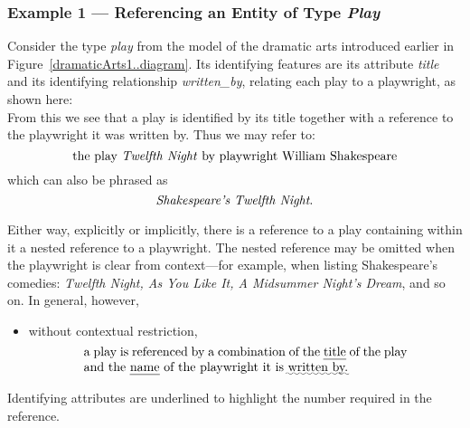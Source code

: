 \subsubsection{Example 1 — Referencing an Entity of Type \textit{Play}}

Consider the type \textit{play} from the model of the dramatic arts introduced earlier in Figure~\ref{dramaticArts1..diagram}.
Its identifying features are its attribute \textit{title} and its identifying relationship \textit{written\_by}, relating each play to a playwright, as shown here:
\begin{equation*}

\end{equation*}
From this we see that a play is identified by its title together with a reference to the playwright it was written by.
Thus we may refer to:
\begin{equation}
\mbox{the play \textit{Twelfth Night} by playwright William Shakespeare}
\end{equation}
which can also be phrased as
\begin{equation}
\mbox{\textit{Shakespeare’s Twelfth Night}.}
\end{equation}

Either way, explicitly or implicitly, there is a reference to a play containing within it a nested reference to a playwright.
The nested reference may be omitted when the playwright is clear from context—for example, when listing Shakespeare’s comedies:
\textit{Twelfth Night, As You Like It, A Midsummer Night’s Dream}, and so on.
In general, however,
\begin{itemize}
\item without contextual restriction,
\begin{equation}
\label{absolutePlayReferencing}
\text{\parbox{9cm}{
a play is referenced by a combination of the \uline{title} of the play and the \uline{name} of the playwright it is \uwave{written by.}
}}
\end{equation}
\end{itemize}
Identifying attributes are underlined to highlight the number required in the reference.


